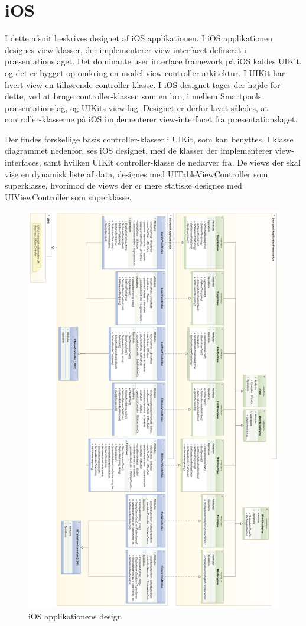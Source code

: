 \section{iOS}
I dette afsnit beskrives designet af iOS applikationen. I iOS applikationen designes view-klasser, der implementerer view-interfacet defineret i præsentationslaget. Det dominante user interface framework på iOS kaldes UIKit, og det er bygget op omkring en model-view-controller arkitektur. I UIKit har hvert view en tilhørende controller-klasse. I iOS designet tages der højde for dette, ved at bruge controller-klassen som en bro, i mellem Smartpools præsentationslag, og UIKits view-lag. Designet er derfor lavet således, at controller-klasserne på iOS implementerer view-interfacet fra præsentationslaget.

Der findes forskellige basis controller-klasser i UIKit, som kan benyttes. I klasse diagrammet nedenfor, ses iOS designet, med de klasser der implementerer view-interfaces, samt hvilken UIKit controller-klasse de nedarver fra. De views der skal vise en dynamisk liste af data, designes med UITableViewController som superklasse, hvorimod de views der er mere statiske designes med UIViewController som superklasse. 

\begin{figure}
	\centering
	\includegraphics[width=0.9\linewidth]{figs/design/ios_full}
	\caption{iOS applikationens design}
	\label{fig:ios_full}
\end{figure}

